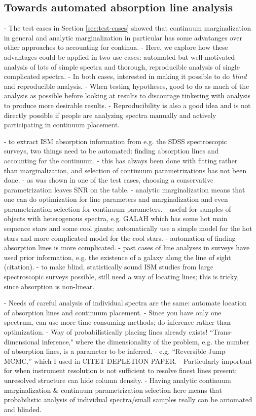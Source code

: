 \documentclass[manuscript]{aastex62}
\begin{document}
\subsection{Towards automated absorption line analysis}
- The test cases in Section \ref{sec:test-cases} showed that continuum marginalization in general and analytic marginalization in particular has some advatanges over other approaches to accounting for continua.
- Here, we explore how these advantages could be applied in two use cases: automated but well-motivated analysis of lots of simple spectra and thorough, reproducible analysis of single complicated spectra.
- In both cases, interested in making it possible to do \emph{blind} and reproducible analysis.
- When testing hypotheses, good to do as much of the analysis as possible before looking at results to discourage tinkering with analysis to produce more desirable results.
- Reproducibility is also a good idea and is not directly possible if people are analyzing spectra manually and actively participating in continuum placement.

- to extract ISM absorption information from e.g. the SDSS spectroscopic surveys, two things need to be automated: finding absorption lines and accounting for the continuum.
- this has always been done with fitting rather than marginalization, and selection of continuum parametrizations has not been done.
- as was shown in one of the test cases, choosing a conservative parametrization leaves SNR on the table.
- analytic marginalization means that one can do optimization for line parameters and marginalization and even parametrization selection for continuum parameters.
- useful for samples of objects with heterogenous spectra, e.g. GALAH which has some hot main sequence stars and some cool giants; automatically use a simple model for the hot stars and more complicated model for the cool stars.
- automation of finding absorption lines is more complicated.
- past cases of line analyses in surveys have used prior information, e.g. the existence of a galaxy along the line of sight (citation).
- to make blind, statistically sound ISM studies from large spectroscopic surveys possible, still need a way of locating lines; this is tricky, since absorption is non-linear.

- Needs of careful analysis of individual spectra are the same: automate location of absorption lines and continuum placement.
- Since you have only one spectrum, can use more time consuming methods; do inference rather than optimization.
- Way of probabilistically placing lines already exists! ``Trans-dimensional inference," where the dimensionality of the problem, e.g. the number of absorption lines, is a parameter to be inferred.
- e.g. ``Reversible Jump MCMC,'' which I used in CITET DEPLETION PAPER.
- Particularly important for when instrument resolution is not sufficient to resolve finest lines present; unresolved structure can hide column density.
- Having analytic continuum marginalization \& continuum parametrization selection here means that probabilistic analysis of individual spectra/small samples really can be automated and blinded.
\end{document}

